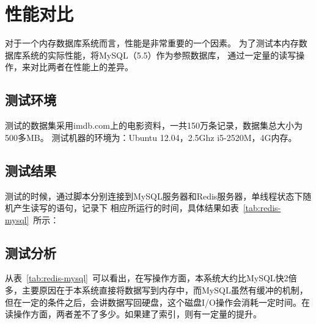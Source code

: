 \documentclass{zjutthesis}
\begin{document}
\chapter{性能对比}
对于一个内存数据库系统而言，性能是非常重要的一个因素。
为了测试本内存数据库系统的实际性能，将MySQL（5.5）作为参照数据库，
通过一定量的读写操作，来对比两者在性能上的差异。

\section{测试环境}
测试的数据集采用imdb.com上的电影资料，一共150万条记录，数据集总大小为500多MB。
测试机器的环境为：Ubuntu 12.04，2.5Ghz i5-2520M，4G内存。

\section{测试结果}
测试的时候，通过脚本分别连接到MySQL服务器和Redis服务器，单线程状态下随机产生读写的语句，记录下
相应所运行的时间，具体结果如表~\ref{tab:redis-mysql}~所示：

\begin{table}[H]
\centering
\caption{性能对比}\label{tab:redis-mysql}
\vspace{\baselineskip}
\end{table}

\section{测试分析}
从表~\ref{tab:redis-mysql}~可以看出，在写操作方面，本系统大约比MySQL快2倍多，主要原因在于本系统直接将数据写到内存中，而MySQL虽然有缓冲的机制，但在一定的条件之后，会讲数据写回硬盘，这个磁盘I/O操作会消耗一定时间。在读操作方面，两者差不了多少。如果建了索引，则有一定量的提升。
\end{document}

